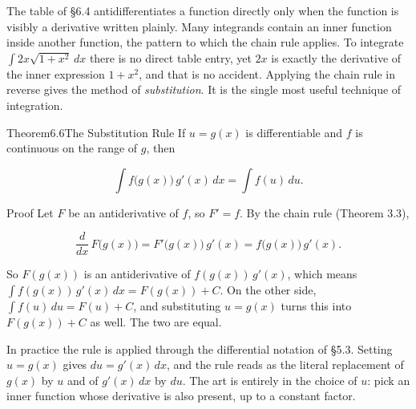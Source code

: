 \documentclass[a4paper,12pt,oneside]{memoir}
\begin{document}
The table of §6.4 antidifferentiates a function directly only when the function is visibly a derivative written plainly. Many integrands contain an inner function inside another function, the pattern to which the chain rule applies. To integrate \(\int 2x\sqrt{1 + x^{2}}\,dx\) there is no direct table entry, yet \(2x\) is exactly the derivative of the inner expression \(1 + x^{2}\), and that is no accident. Applying the chain rule in reverse gives the method of \emph{substitution}. It is the single most useful technique of integration.

\begin{envtheorem}{Theorem}{6.6}{The Substitution Rule}
If \(u = g(x)\) is differentiable and \(f\) is continuous on the range of \(g\), then

\[ \int f\bigl(g(x)\bigr)\,g'(x)\,dx = \int f(u)\,du. \]
\end{envtheorem}
\begin{envproof}{Proof}{}{}
Let \(F\) be an antiderivative of \(f\), so \(F' = f\). By the chain rule (Theorem 3.3),

\[ \frac{d}{dx}\,F\bigl(g(x)\bigr) = F'\bigl(g(x)\bigr)\,g'(x) = f\bigl(g(x)\bigr)\,g'(x). \]

So \(F(g(x))\) is an antiderivative of \(f(g(x))\,g'(x)\), which means \(\int f(g(x))\,g'(x)\,dx = F(g(x)) + C\). On the other side, \(\int f(u)\,du = F(u) + C\), and substituting \(u = g(x)\) turns this into \(F(g(x)) + C\) as well. The two are equal. \qedmark
\end{envproof}
In practice the rule is applied through the differential notation of §5.3. Setting \(u = g(x)\) gives \(du = g'(x)\,dx\), and the rule reads as the literal replacement of \(g(x)\) by \(u\) and of \(g'(x)\,dx\) by \(du\). The art is entirely in the choice of \(u\): pick an inner function whose derivative is also present, up to a constant factor.
\end{document}
